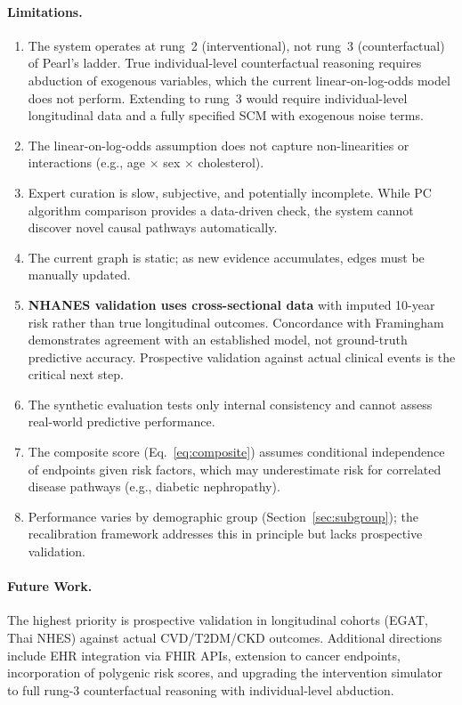 \documentclass[runningheads]{llncs}
\begin{document}
\paragraph{Limitations.}
\begin{enumerate}
\item The system operates at rung~2 (interventional), not rung~3
  (counterfactual) of Pearl's ladder.  True individual-level
  counterfactual reasoning requires abduction of exogenous variables,
  which the current linear-on-log-odds model does not perform.
  Extending to rung~3 would require individual-level longitudinal data
  and a fully specified SCM with exogenous noise terms.
\item The linear-on-log-odds assumption does not capture non-linearities
  or interactions (e.g., age $\times$ sex $\times$ cholesterol).
\item Expert curation is slow, subjective, and potentially incomplete.
  While PC algorithm comparison provides a data-driven check, the system
  cannot discover novel causal pathways automatically.
\item The current graph is static; as new evidence accumulates, edges
  must be manually updated.
\item \textbf{NHANES validation uses cross-sectional data} with imputed
  10-year risk rather than true longitudinal outcomes.  Concordance
  with Framingham demonstrates agreement with an established model,
  not ground-truth predictive accuracy.  Prospective validation against
  actual clinical events is the critical next step.
\item The synthetic evaluation tests only internal consistency and cannot
  assess real-world predictive performance.
\item The composite score (Eq.~\ref{eq:composite}) assumes conditional
  independence of endpoints given risk factors, which may underestimate
  risk for correlated disease pathways (e.g., diabetic nephropathy).
\item Performance varies by demographic group
  (Section~\ref{sec:subgroup}); the recalibration framework addresses
  this in principle but lacks prospective validation.
\end{enumerate}

\paragraph{Future Work.}
The highest priority is prospective validation in longitudinal cohorts
(EGAT, Thai NHES) against actual CVD/T2DM/CKD outcomes.  Additional
directions include EHR integration via FHIR APIs, extension to cancer
endpoints, incorporation of polygenic risk scores, and upgrading the
intervention simulator to full rung-3 counterfactual reasoning with
individual-level abduction.
\end{document}
